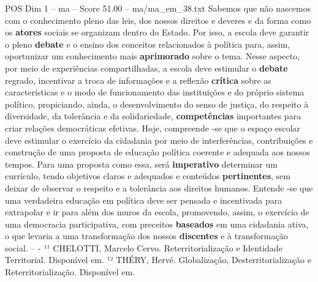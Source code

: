 \begin{textsample}{POS Dim 1 – ma – Score 51.00 – ma/ma\_em\_38.txt}
Sabemos que não nascemos com o conhecimento pleno das leis, dos nossos direitos e deveres e da forma como os \textbf{atores} sociais se organizam dentro do Estado.
Por isso, a escola deve garantir o pleno \textbf{debate} e o ensino dos conceitos relacionados à política para, assim, oportunizar um conhecimento mais \textbf{aprimorado} sobre o tema.
Nesse aspecto, por meio de experiências compartilhadas, a escola deve estimular o \textbf{debate} regrado, incentivar a troca de informações e a reflexão \textbf{crítica} sobre as características e o modo de funcionamento das instituições e do próprio sistema político, propiciando, ainda, o desenvolvimento do senso de justiça, do respeito à diversidade, da tolerância e da solidariedade, \textbf{competências} importantes para criar relações democráticas efetivas.
Hoje, compreende -se que o espaço escolar deve estimular o exercício da cidadania por meio de interferências, contribuições e construção de uma proposta de educação política coerente e adequada aos nossos tempos.
Para uma proposta como essa, será \textbf{imperativo} determinar um currículo, tendo objetivos claros e adequados e conteúdos \textbf{pertinentes}, sem deixar de observar o respeito e a tolerância aos direitos humanos.
Entende -se que uma verdadeira educação em política deve ser pensada e incentivada para extrapolar e ir para além dos muros da escola, promovendo, assim, o exercício de uma democracia participativa, com preceitos \textbf{baseados} em uma cidadania ativa, o que levaria a uma transformação dos nossos \textbf{discentes} e à transformação social. -- - ¹¹ CHELOTTI, Marcelo Cervo.
Reterritorialização e Identidade Territorial.
Disponível em. ¹² THÉRY, Hervé.
Globalização, Desterritorialização e Reterritorialização.
Disponível em.

\end{textsample}
